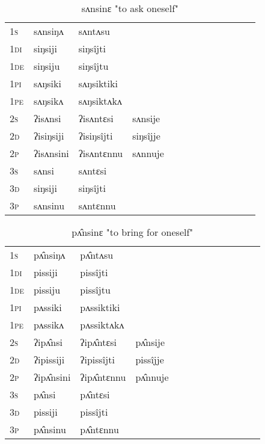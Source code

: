 \documentclass[oldfontcommands,oneside,a4paper,11pt]{article}
\begin{document}
\begin{table}[H]
\label{iŋ.vr} \centering 
\caption{sʌnsinɛ  "to ask oneself"  }
\begin{tabular}{l|l|l|l|l|l|l|l|l|l|l|l|l}  \toprule
\textsc{1s} &sʌnsiŋʌ &sʌntʌsu \\ 
\textsc{1di} &siŋsiji &siŋsîjti   \\
\textsc{1de} &siŋsiju &siŋsîjtu   \\ 
\textsc{1pi} &sʌŋsiki &sʌŋsiktiki   \\ 
\textsc{1pe} &sʌŋsikʌ &sʌŋsiktʌkʌ   \\ 
\textsc{2s} & ʔisʌnsi & ʔisʌntɛsi &sʌnsije  \\ 
\textsc{2d} & ʔisiŋsiji & ʔisiŋsîjti &siŋsîjje    \\
\textsc{2p} & ʔisʌnsini  & ʔisʌntɛnnu &sʌnnuje  \\ 
\textsc{3s} & sʌnsi & sʌntɛsi   \\ 
\textsc{3d} & siŋsiji & siŋsîjti   \\ 
\textsc{3p} & sʌnsinu  & sʌntɛnnu \\ 
\bottomrule
\end{tabular}
\end{table}


\begin{table}[H]
\label{it.vr} \centering 
\caption{pʌ̂nsinɛ  "to bring for oneself"  }
\begin{tabular}{l|l|l|l|l|l|l|l|l|l|l|l|l}  \toprule
\textsc{1s} &pʌ̂nsiŋʌ &pʌ̂ntʌsu \\ 
\textsc{1di} &pissiji &pissîjti   \\
\textsc{1de} &pissiju &pissîjtu   \\ 
\textsc{1pi} &pʌssiki &pʌssiktiki   \\ 
\textsc{1pe} &pʌssikʌ &pʌssiktʌkʌ   \\ 
\textsc{2s} & ʔipʌ̂nsi & ʔipʌ̂ntɛsi &pʌ̂nsije  \\ 
\textsc{2d} & ʔipissiji & ʔipissîjti &pissîjje    \\
\textsc{2p} & ʔipʌ̂nsini  & ʔipʌ̂ntɛnnu &pʌ̂nnuje  \\ 
\textsc{3s} & pʌ̂nsi & pʌ̂ntɛsi   \\ 
\textsc{3d} & pissiji & pissîjti   \\ 
\textsc{3p} & pʌ̂nsinu  & pʌ̂ntɛnnu \\ 
\bottomrule
\end{tabular}
\end{table}
\end{document}
